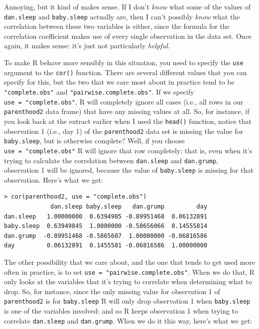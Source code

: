 \documentclass[
]{book}
\begin{document}
Annoying, but it kind of makes sense. If I don't \emph{know} what some of the values of \texttt{dan.sleep} and \texttt{baby.sleep} actually are, then I can't possibly \emph{know} what the correlation between these two variables is either, since the formula for the correlation coefficient makes use of every single observation in the data set. Once again, it makes sense: it's just not particularly \emph{helpful}.

To make R behave more sensibly in this situation, you need to specify the \texttt{use} argument to the \texttt{cor()} function. There are several different values that you can specify for this, but the two that we care most about in practice tend to be \texttt{"complete.obs"} and \texttt{"pairwise.complete.obs"}. If we specify \texttt{use\ =\ "complete.obs"}, R will completely ignore all cases (i.e., all rows in our \texttt{parenthood2} data frame) that have any missing values at all. So, for instance, if you look back at the extract earlier when I used the \texttt{head()} function, notice that observation 1 (i.e., day 1) of the \texttt{parenthood2} data set is missing the value for \texttt{baby.sleep}, but is otherwise complete? Well, if you choose \texttt{use\ =\ "complete.obs"} R will ignore that row completely: that is, even when it's trying to calculate the correlation between \texttt{dan.sleep} and \texttt{dan.grump}, observation 1 will be ignored, because the value of \texttt{baby.sleep} is missing for that observation. Here's what we get:

\begin{verbatim}
> cor(parenthood2, use = "complete.obs")
             dan.sleep baby.sleep   dan.grump         day
dan.sleep   1.00000000  0.6394985 -0.89951468  0.06132891
baby.sleep  0.63949845  1.0000000 -0.58656066  0.14555814
dan.grump  -0.89951468 -0.5865607  1.00000000 -0.06816586
day         0.06132891  0.1455581 -0.06816586  1.00000000
\end{verbatim}

The other possibility that we care about, and the one that tends to get used more often in practice, is to set \texttt{use\ =\ "pairwise.complete.obs"}. When we do that, R only looks at the variables that it's trying to correlate when determining what to drop. So, for instance, since the only missing value for observation 1 of \texttt{parenthood2} is for \texttt{baby.sleep} R will only drop observation 1 when \texttt{baby.sleep} is one of the variables involved: and so R keeps observation 1 when trying to correlate \texttt{dan.sleep} and \texttt{dan.grump}. When we do it this way, here's what we get:
\end{document}
